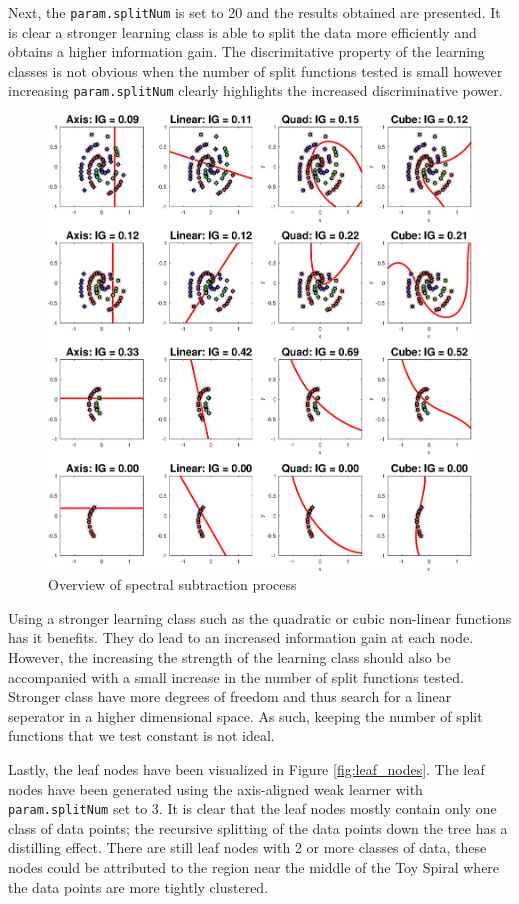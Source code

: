 \documentclass[a4paper,pra,twocolumn,10pt,aps,longbibliography,nobalancelastpage]{revtex4-1}
\begin{document}
Next, the \texttt{param.splitNum} is set to 20 and the results obtained are presented. It is clear a stronger learning class is able to split the data more efficiently and obtains a higher information gain. The discrimitative property of the learning classes is not obvious when the number of split functions tested is small however increasing \texttt{param.splitNum} clearly highlights the increased discriminative power. 

\begin{figure}[H]
	\centering
    \includegraphics[width=0.60\columnwidth]{split_function_visualitions_5}
    \caption{Overview of spectral subtraction process}
    \label{fig:spec_sub_overview}
\end{figure}

Using a stronger learning class such as the quadratic or cubic non-linear functions has it benefits. They do lead to an increased information gain at each node. However, the increasing the strength of the learning class should also be accompanied with a small increase in the number of split functions tested. Stronger class have more degrees of freedom and thus search for a linear seperator in a higher dimensional space. As such, keeping the number of split functions that we test constant is not ideal.


Lastly, the leaf nodes have been visualized in Figure \ref{fig:leaf_nodes}. The leaf nodes have been generated using the axis-aligned weak learner with \texttt{param.splitNum} set to 3. It is clear that the leaf nodes mostly contain only one class of data points; the recursive splitting of the data points down the tree has a distilling effect. There are still leaf nodes with 2 or more classes of data, these nodes could be attributed to the region near the middle of the Toy Spiral where the data points are more tightly clustered.
\end{document}
